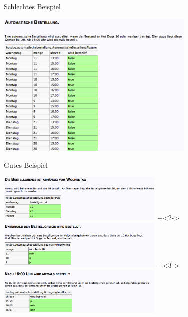 \begin{frame}{Schlechtes Beispiel}

\begin{center}
\includegraphics[height=7cm]{SchlechtesBeispiel.png} \newline
\end{center}

\end{frame}

\begin{frame}{Gutes Beispiel}

\begin{center}
\includegraphics[width=8cm]{GutesBeispiel1.png} \newline
\onslide+<2->
\includegraphics[width=8cm]{GutesBeispiel2.png} \newline
\onslide+<3->
\includegraphics[width=8cm]{GutesBeispiel3.png} \newline
\end{center}

\end{frame}

